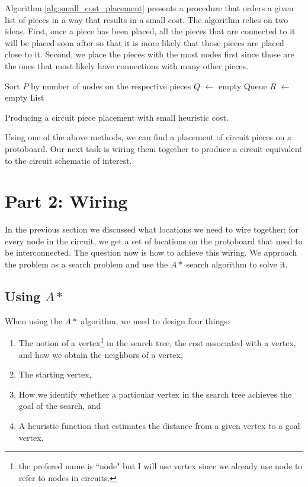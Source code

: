 Algorithm \ref{alg:small_cost_placement} presents a procedure that orders a
given list of pieces in a way that results in a small cost. The algorithm relies
on two ideas. First, once a piece has been placed, all the pieces that are
connected to it will be placed soon after so that it is more likely that those
pieces are placed close to it. Second, we place the pieces with the most nodes
first since those are the ones that most likely have connections with many other
pieces.

\begin{algorithm}
\BlankLine
Sort $P$ by number of nodes on the respective pieces\;
$Q$ $\leftarrow$ empty Queue\;
$R$ $\leftarrow$ empty List\;

\caption{Producing a circuit piece placement with small heuristic cost.}
\label{alg:small_cost_placement}
\end{algorithm}

Using one of the above methods, we can find a placement of circuit pieces on a
protoboard. Our next task is wiring them together to produce a circuit
equivalent to the circuit schematic of interest.

\section{Part 2: Wiring}

In the previous section we discussed what locations we need to wire together:
for every node in the circuit, we get a set of locations on the protoboard that
need to be interconnected. The question now is how to achieve this wiring. We
approach the problem as a search problem and use the $A*$ search algorithm to
solve it.

\subsection{Using $A*$}

When using the $A*$ algorithm, we need to design four things:

\begin{enumerate}
\item The notion of a vertex\footnote{the prefered name is ``node" but I will
use vertex since we already use node to refer to nodes in circuits.} in the
search tree, the cost associated with a vertex, and how we obtain the neighbors
of a vertex,
\item The starting vertex,
\item How we identify whether a particular vertex in the search tree achieves
the goal of the search, and
\item A heuristic function that estimates the distance from a given vertex to a
goal vertex.
\end{enumerate}

